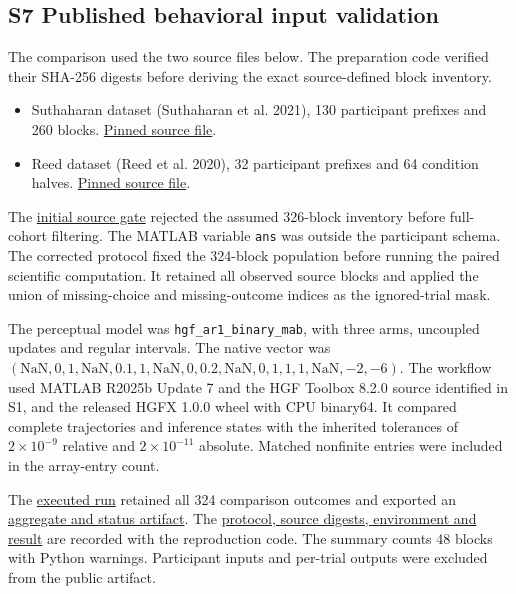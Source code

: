 \documentclass[
  11pt,
]{article}
\providecommand{\tightlist}{%
  \setlength{\itemsep}{0pt}\setlength{\parskip}{0pt}}
\begin{document}
\clearpage

\subsection{S7 Published behavioral input
validation}\label{s7-published-behavioral-input-validation}

The comparison used the two source files below. The preparation code
verified their SHA-256 digests before deriving the exact source-defined
block inventory.

\begin{itemize}
\tightlist
\item
  Suthaharan dataset (Suthaharan et al. 2021), 130 participant prefixes
  and 260 blocks.
  \href{https://github.com/psuthaharan/covid19paranoia/blob/c618e032228fb4ed03821f11bdc57af608695631/data/hgfPRL/pandemic_prelockdown_TP117_TP261_130.mat}{Pinned
  source file}.
\item
  Reed dataset (Reed et al. 2020), 32 participant prefixes and 64
  condition halves.
  \href{https://github.com/ModelDBRepository/258631/blob/39ccaca508b81ca610e7666a613e061c801faaf9/IRL_Data.mat}{Pinned
  source file}.
\end{itemize}

The
\href{https://github.com/ahmadkhanloo/hgfx/actions/runs/41809479255}{initial
source gate} rejected the assumed 326-block inventory before full-cohort
filtering. The MATLAB variable \texttt{ans} was outside the participant
schema. The corrected protocol fixed the 324-block population before
running the paired scientific computation. It retained all observed
source blocks and applied the union of missing-choice and
missing-outcome indices as the ignored-trial mask.

The perceptual model was \texttt{hgf\_ar1\_binary\_mab}, with three
arms, uncoupled updates and regular intervals. The native vector was
\((\mathrm{NaN},0,1,\mathrm{NaN},0.1,1,\mathrm{NaN},0,0.2,\mathrm{NaN},0,1,1,1,\mathrm{NaN},-2,-6)\).
The workflow used MATLAB R2025b Update 7 and the HGF Toolbox 8.2.0
source identified in S1, and the released HGFX 1.0.0 wheel with CPU
binary64. It compared complete trajectories and inference states with
the inherited tolerances of \(2\times10^{-9}\) relative and
\(2\times10^{-11}\) absolute. Matched nonfinite entries were included in
the array-entry count.

The
\href{https://github.com/ahmadkhanloo/hgfx/actions/runs/41809919116}{executed
run} retained all 324 comparison outcomes and exported an
\href{https://github.com/ahmadkhanloo/hgfx/actions/runs/41809919116/artifacts/13311622738}{aggregate
and status artifact}. The
\href{https://github.com/ahmadkhanloo/hgfx/blob/2dedd1dcf102ecc598f9151c2dc3ed6933c8c494/paper/case_studies/REALDATA_FORWARD_PARITY_RESULT_2026-11-04.md}{protocol,
source digests, environment and result} are recorded with the
reproduction code. The summary counts 48 blocks with Python warnings.
Participant inputs and per-trial outputs were excluded from the public
artifact.
\end{document}

